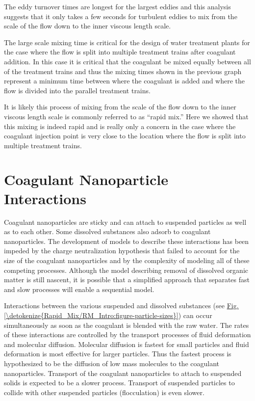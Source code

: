 \documentclass[letterpaper,10pt,english]{sphinxmanual}
\begin{document}
The eddy turnover times are longest for the largest eddies and this analysis suggests that it only takes a few seconds for turbulent eddies to mix from the scale of the flow down to the inner viscous length scale.

The large scale mixing time is critical for the design of water treatment plants for the case where the flow is split into multiple treatment trains after coagulant addition. In this case it is critical that the coagulant be mixed equally between all of the treatment trains and thus the mixing times shown in the previous graph represent a minimum time between where the coagulant is added and where the flow is divided into the parallel treatment trains.

It is likely this process of mixing from the scale of the flow down to the inner viscous length scale is commonly referred to as “rapid mix.” Here we showed that this mixing is indeed rapid and is really only a concern in the case where the coagulant injection point is very close to the location where the flow is split into multiple treatment trains.


\section{Coagulant Nanoparticle Interactions}
\label{\detokenize{Rapid_Mix/RM_Intro:coagulant-nanoparticle-interactions}}\label{\detokenize{Rapid_Mix/RM_Intro:heading-coagulant-nanoparticle-interactions}}
Coagulant nanoparticles are sticky and can attach to suspended particles as well as to each other. Some dissolved substances also adsorb to coagulant nanoparticles. The development of models to describe these interactions has been impeded by the charge neutralization hypothesis that failed to account for the size of the coagulant nanoparticles and by the complexity of modeling all of these competing processes. Although the model describing removal of dissolved organic matter is still nascent, it is possible that a simplified approach that separates fast and slow processes will enable a sequential model.

Interactions between the various suspended and dissolved substances (see \hyperref[\detokenize{Rapid_Mix/RM_Intro:figure-particle-sizes}]{Fig.\@ \ref{\detokenize{Rapid_Mix/RM_Intro:figure-particle-sizes}}}) can occur simultaneously as soon as the coagulant is blended with the raw water. The rates of these interactions are controlled by the transport processes of fluid deformation and molecular diffusion. Molecular diffusion is fastest for small particles and fluid deformation is most effective for larger particles. Thus the fastest process is hypothesized to be the diffusion of low mass molecules to the coagulant nanoparticles. Transport of the coagulant nanoparticles to attach to suspended solids is expected to be a slower process. Transport of suspended particles to collide with other suspended particles (flocculation) is even slower.
\end{document}
